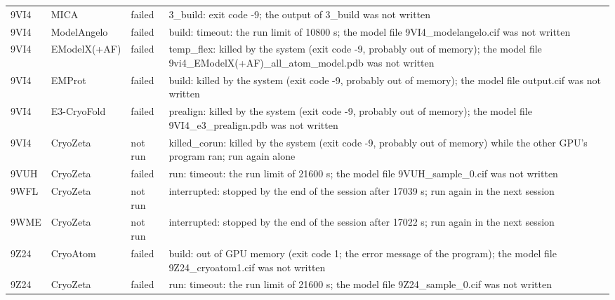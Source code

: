 \begin{tabular}{@{}lllp{9.4cm}@{}}
9VI4 & MICA & failed & 3\_build: exit code -9; the output of 3\_build was not written \\
9VI4 & ModelAngelo & failed & build: timeout: the run limit of 10800 s; the model file 9VI4\_modelangelo.cif was not written \\
9VI4 & EModelX(+AF) & failed & temp\_flex: killed by the system (exit code -9, probably out of memory); the model file 9vi4\_EModelX(+AF)\_all\_atom\_model.pdb was not written \\
9VI4 & EMProt & failed & build: killed by the system (exit code -9, probably out of memory); the model file output.cif was not written \\
9VI4 & E3-CryoFold & failed & prealign: killed by the system (exit code -9, probably out of memory); the model file 9VI4\_e3\_prealign.pdb was not written \\
9VI4 & CryoZeta & not run & killed\_corun: killed by the system (exit code -9, probably out of memory) while the other GPU's program ran; run again alone \\
9VUH & CryoZeta & failed & run: timeout: the run limit of 21600 s; the model file 9VUH\_sample\_0.cif was not written \\
9WFL & CryoZeta & not run & interrupted: stopped by the end of the session after 17039 s; run again in the next session \\
9WME & CryoZeta & not run & interrupted: stopped by the end of the session after 17022 s; run again in the next session \\
9Z24 & CryoAtom & failed & build: out of GPU memory (exit code 1; the error message of the program); the model file 9Z24\_cryoatom1.cif was not written \\
9Z24 & CryoZeta & failed & run: timeout: the run limit of 21600 s; the model file 9Z24\_sample\_0.cif was not written \\
\bottomrule
\end{tabular}

